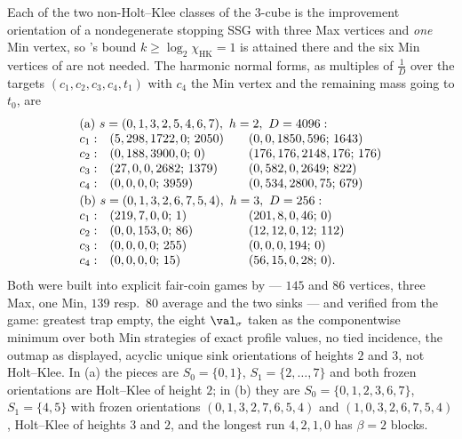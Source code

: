 \begin{proposition}[The Min-count bound is attained at $m=3$]\label{mb:m3-one-min}
Each of the two non-Holt--Klee classes of the $3$-cube is the improvement
orientation of a nondegenerate stopping SSG with three Max vertices and
\emph{one} Min vertex, so 's bound
$k\ge\log_2\chi_{\mathrm{HK}}=1$ is attained there and the six Min vertices
of  are not needed. The harmonic normal forms, as
multiples of $\tfrac1{D}$ over the targets $(c_1,c_2,c_3,c_4,t_1)$ with
$c_4$ the Min vertex and the remaining mass going to $t_0$, are
\[
 \begin{array}{r@{\quad}l@{\qquad}l}
  \multicolumn{3}{l}{\text{(a) } s=(0,1,3,2,5,4,6,7),\ h=2,\ D=4096:}\\
  c_1: & (5,298,1722,0;\,2050)   & (0,0,1850,596;\,1643)\\
  c_2: & (0,188,3900,0;\,0)      & (176,176,2148,176;\,176)\\
  c_3: & (27,0,0,2682;\,1379)    & (0,582,0,2649;\,822)\\
  c_4: & (0,0,0,0;\,3959)        & (0,534,2800,75;\,679)\\[2pt]
  \multicolumn{3}{l}{\text{(b) } s=(0,1,3,2,6,7,5,4),\ h=3,\ D=256:}\\
  c_1: & (219,7,0,0;\,1)         & (201,8,0,46;\,0)\\
  c_2: & (0,0,153,0;\,86)        & (12,12,0,12;\,112)\\
  c_3: & (0,0,0,0;\,255)         & (0,0,0,194;\,0)\\
  c_4: & (0,0,0,0;\,15)          & (56,15,0,28;\,0).
 \end{array}
\]
Both were built into explicit fair-coin games by  ---
$145$ and $86$ vertices, three Max, one Min, $139$ resp.\ $80$ average and
the two sinks --- and verified from the game: greatest trap empty, the
eight $\val_\sigma$ taken as the componentwise minimum over both Min
strategies of exact profile values, no tied incidence, the outmap as
displayed, acyclic unique sink orientations of heights $2$ and $3$, not
Holt--Klee. In (a) the pieces are $S_0=\{0,1\}$, $S_1=\{2,\dots,7\}$ and
both frozen orientations are Holt--Klee of height $2$; in (b) they are
$S_0=\{0,1,2,3,6,7\}$, $S_1=\{4,5\}$ with frozen orientations
$(0,1,3,2,7,6,5,4)$ and $(1,0,3,2,6,7,5,4)$, Holt--Klee of heights $3$ and
$2$, and the longest run $4,2,1,0$ has $\beta=2$ blocks.
\end{proposition}

